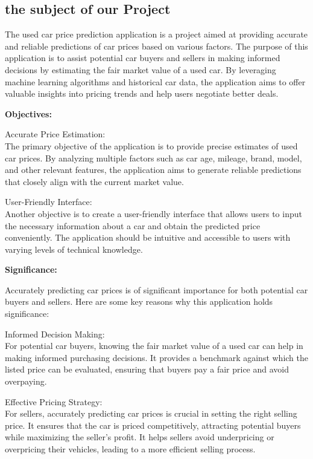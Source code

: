 \documentclass{article}
\begin{document}
\subsection{the subject of our Project}

\begin{flushleft}
The used car price prediction application is a project aimed at providing accurate and reliable predictions of car prices based on various factors. The purpose of this application is to assist potential car buyers and sellers in making informed decisions by estimating the fair market value of a used car. By leveraging machine learning algorithms and historical car data, the application aims to offer valuable insights into pricing trends and help users negotiate better deals.

\textbf{Objectives:} 

\item [\ding{118}]Accurate Price Estimation: \\
The primary objective of the application is to provide precise estimates of used car prices. By analyzing multiple factors such as car age, mileage, brand, model, and other relevant features, the application aims to generate reliable predictions that closely align with the current market value.

\item [\ding{118}]User-Friendly Interface:\\
Another objective is to create a user-friendly interface that allows users to input the necessary information about a car and obtain the predicted price conveniently. The application should be intuitive and accessible to users with varying levels of technical knowledge.

\textbf{Significance:}

Accurately predicting car prices is of significant importance for both potential car buyers and sellers. Here are some key reasons why this application holds significance:

\item [\ding{90}]Informed Decision Making: \\
For potential car buyers, knowing the fair market value of a used car can help in making informed purchasing decisions. It provides a benchmark against which the listed price can be evaluated, ensuring that buyers pay a fair price and avoid overpaying.

\item [\ding{90}]Effective Pricing Strategy: \\
For sellers, accurately predicting car prices is crucial in setting the right selling price. It ensures that the car is priced competitively, attracting potential buyers while maximizing the seller's profit. It helps sellers avoid underpricing or overpricing their vehicles, leading to a more efficient selling process.


\end{flushleft}
\end{document}
